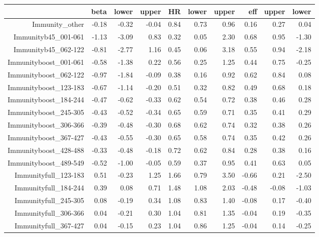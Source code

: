 \begin{table}[ht]
\centering
\begin{tabular}{rrrrrrrrrr}
  \hline
 & beta & lower & upper & HR & lower & upper & eff & upper & lower \\ 
  \hline
Immunity\_other & -0.18 & -0.32 & -0.04 & 0.84 & 0.73 & 0.96 & 0.16 & 0.27 & 0.04 \\ 
  Immunityb45\_001-061 & -1.13 & -3.09 & 0.83 & 0.32 & 0.05 & 2.30 & 0.68 & 0.95 & -1.30 \\ 
  Immunityb45\_062-122 & -0.81 & -2.77 & 1.16 & 0.45 & 0.06 & 3.18 & 0.55 & 0.94 & -2.18 \\ 
  Immunityboost\_001-061 & -0.58 & -1.38 & 0.22 & 0.56 & 0.25 & 1.25 & 0.44 & 0.75 & -0.25 \\ 
  Immunityboost\_062-122 & -0.97 & -1.84 & -0.09 & 0.38 & 0.16 & 0.92 & 0.62 & 0.84 & 0.08 \\ 
  Immunityboost\_123-183 & -0.67 & -1.14 & -0.20 & 0.51 & 0.32 & 0.82 & 0.49 & 0.68 & 0.18 \\ 
  Immunityboost\_184-244 & -0.47 & -0.62 & -0.33 & 0.62 & 0.54 & 0.72 & 0.38 & 0.46 & 0.28 \\ 
  Immunityboost\_245-305 & -0.43 & -0.52 & -0.34 & 0.65 & 0.59 & 0.71 & 0.35 & 0.41 & 0.29 \\ 
  Immunityboost\_306-366 & -0.39 & -0.48 & -0.30 & 0.68 & 0.62 & 0.74 & 0.32 & 0.38 & 0.26 \\ 
  Immunityboost\_367-427 & -0.43 & -0.55 & -0.30 & 0.65 & 0.58 & 0.74 & 0.35 & 0.42 & 0.26 \\ 
  Immunityboost\_428-488 & -0.33 & -0.48 & -0.18 & 0.72 & 0.62 & 0.84 & 0.28 & 0.38 & 0.16 \\ 
  Immunityboost\_489-549 & -0.52 & -1.00 & -0.05 & 0.59 & 0.37 & 0.95 & 0.41 & 0.63 & 0.05 \\ 
  Immunityfull\_123-183 & 0.51 & -0.23 & 1.25 & 1.66 & 0.79 & 3.50 & -0.66 & 0.21 & -2.50 \\ 
  Immunityfull\_184-244 & 0.39 & 0.08 & 0.71 & 1.48 & 1.08 & 2.03 & -0.48 & -0.08 & -1.03 \\ 
  Immunityfull\_245-305 & 0.08 & -0.19 & 0.34 & 1.08 & 0.83 & 1.40 & -0.08 & 0.17 & -0.40 \\ 
  Immunityfull\_306-366 & 0.04 & -0.21 & 0.30 & 1.04 & 0.81 & 1.35 & -0.04 & 0.19 & -0.35 \\ 
  Immunityfull\_367-427 & 0.04 & -0.15 & 0.23 & 1.04 & 0.86 & 1.25 & -0.04 & 0.14 & -0.25 \\ 

\end{tabular}
\end{table}
